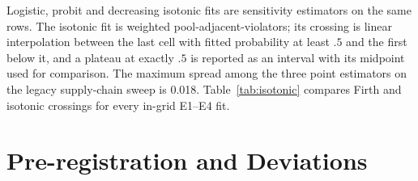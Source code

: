 Logistic, probit and decreasing isotonic fits are sensitivity estimators on the same rows. The isotonic
fit is weighted pool-adjacent-violators; its crossing is linear interpolation between the last cell with
fitted probability at least $.5$ and the first below it, and a plateau at exactly $.5$ is reported as an
interval with its midpoint used for comparison. The maximum spread among the three point estimators on
the legacy supply-chain sweep is 0.018. Table~\ref{tab:isotonic} compares Firth and isotonic crossings for
every in-grid E1--E4 fit.



\FloatBarrier


\FloatBarrier

\section{Pre-registration and Deviations}
\label{app:prereg}

